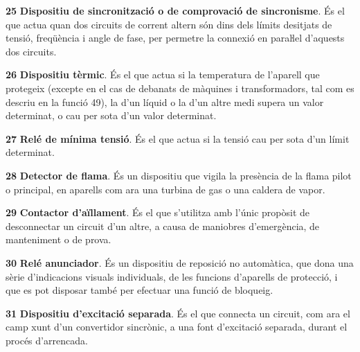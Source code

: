 \begin{multicols}{2}
\begin{list}{}
\item[\textbf{25}]   
\textbf{Dispositiu de sincronització o de comprovació de sincronisme}. És el que actua quan dos circuits de corrent altern
són dins dels límits desitjats de tensió, freqüència i angle de
fase, per permetre la connexió en paraŀlel d'aquests dos circuits.


\item[\textbf{26}]    
\textbf{Dispositiu tèrmic}. És el que
actua si la temperatura de l'aparell que protegeix (excepte en el cas de debanats de màquines i transformadors, tal com es descriu en la funció 49), la d'un líquid o la d'un altre medi  supera un valor
determinat, o cau per sota d'un valor determinat.


\item[\textbf{27}]   
\textbf{Relé de mínima tensió}. És el que
actua si la tensió cau per sota d'un límit determinat.

\item[\textbf{28}]   
\textbf{Detector de flama}. És un dispositiu que vigila la presència de la flama pilot o principal, en aparells  com ara una turbina de gas o una caldera  de vapor.

\item[\textbf{29}]  
\textbf{Contactor d'aïllament}. És el que
s'utilitza amb l'únic propòsit de desconnectar un circuit d'un
altre,  a  causa de maniobres    d'emergència,  de manteniment o de
prova.

\item[\textbf{30}]  
 \textbf{Relé anunciador}. És un dispositiu de
reposició no automàtica, que dona una sèrie d'indicacions visuals
individuals, de les funcions d'aparells de protecció, i que es pot
disposar també per efectuar una funció de bloqueig.

\item[\textbf{31}]  
\textbf{Dispositiu d'excitació separada}. És el que connecta un circuit, com ara el camp xunt
d'un convertidor sincrònic, a una font d'excitació separada, durant el procés
d'arrencada.


\end{list}
\end{multicols}
